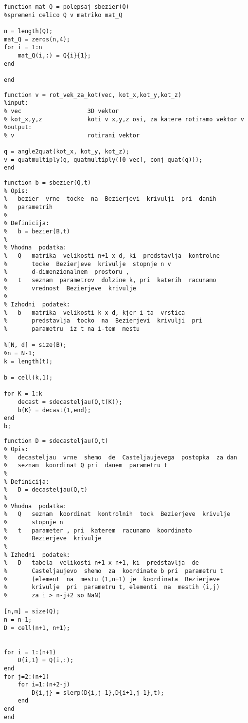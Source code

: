 \documentclass[12pt,a4paper,twoside]{article}
\theoremstyle{definition} %
\theoremstyle{plain} %
\numberwithin{equation}{section}  %
\begin{document}
\begin{lstlisting}[caption = {polepsaj\_sbezier}]
function mat_Q = polepsaj_sbezier(Q)
%spremeni celico Q v matriko mat_Q

n = length(Q);
mat_Q = zeros(n,4);
for i = 1:n
    mat_Q(i,:) = Q{i}{1};
end

end
\end{lstlisting}

\begin{lstlisting}[caption = {rot\_vek\_za\_kot}]
function v = rot_vek_za_kot(vec, kot_x,kot_y,kot_z)
%input:
% vec                   3D vektor
% kot_x,y,z             koti v x,y,z osi, za katere rotiramo vektor v
%output:
% v                     rotirani vektor

q = angle2quat(kot_x, kot_y, kot_z);
v = quatmultiply(q, quatmultiply([0 vec], conj_quat(q)));
end
\end{lstlisting}

\begin{lstlisting}[caption = {sbezier}]
function b = sbezier(Q,t)
% Opis:
%   bezier  vrne  tocke  na  Bezierjevi  krivulji  pri  danih
%   parametrih
%
% Definicija:
%   b = bezier(B,t)
%
% Vhodna  podatka:
%   Q   matrika  velikosti n+1 x d, ki  predstavlja  kontrolne
%       tocke  Bezierjeve  krivulje  stopnje n v
%       d-dimenzionalnem  prostoru ,
%   t   seznam  parametrov  dolzine k, pri  katerih  racunamo
%       vrednost  Bezierjeve  krivulje
%
% Izhodni  podatek:
%   b   matrika  velikosti k x d, kjer i-ta  vrstica
%       predstavlja  tocko  na  Bezierjevi  krivulji  pri
%       parametru  iz t na i-tem  mestu

%[N, d] = size(B);
%n = N-1;
k = length(t);

b = cell(k,1);

for K = 1:k
    decast = sdecasteljau(Q,t(K));
    b{K} = decast(1,end);
end
b;
\end{lstlisting}


\begin{lstlisting}[caption = {sdecasteljau}]
function D = sdecasteljau(Q,t)
% Opis:
%   decasteljau  vrne  shemo  de  Casteljaujevega  postopka  za dan
%   seznam  koordinat Q pri  danem  parametru t
%
% Definicija:
%   D = decasteljau(Q,t)
%
% Vhodna  podatka:
%   Q   seznam  koordinat  kontrolnih  tock  Bezierjeve  krivulje
%       stopnje n
%   t   parameter , pri  katerem  racunamo  koordinato
%       Bezierjeve  krivulje
%
% Izhodni  podatek:
%   D   tabela  velikosti n+1 x n+1, ki  predstavlja  de
%       Casteljaujevo  shemo  za  koordinate b pri  parametru t
%       (element  na  mestu (1,n+1) je  koordinata  Bezierjeve
%       krivulje  pri  parametru t, elementi  na  mestih (i,j)
%       za i > n-j+2 so NaN)

[n,m] = size(Q);
n = n-1;
D = cell(n+1, n+1);


for i = 1:(n+1)
    D{i,1} = Q(i,:);
end
for j=2:(n+1)
    for i=1:(n+2-j)
        D{i,j} = slerp(D{i,j-1},D{i+1,j-1},t);
    end
end
end
\end{lstlisting}
\end{document}
